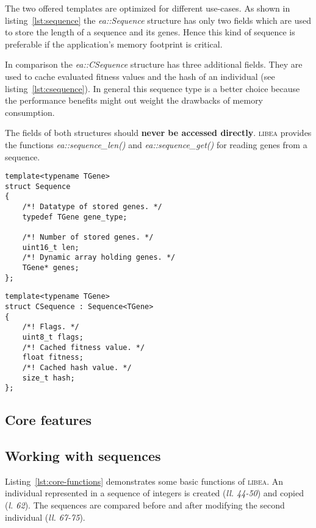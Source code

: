 \documentclass[a4paper]{article}
\begin{document}
The two offered templates are optimized for different use-cases. As shown in listing~\ref{lst:sequence} the \textit{ea::Sequence} structure has only two fields which are used to store the length of a sequence and its genes. Hence this kind of sequence is preferable if the application's memory footprint is critical.

In comparison the \textit{ea::CSequence} structure has three additional fields. They are used to cache evaluated fitness values and the hash of an individual (see listing~\ref{lst:csequence}). In general this sequence type is a better choice because the performance benefits might out weight the drawbacks of memory consumption.

The fields of both structures should \textbf{never be accessed directly}. \textsc{libea} provides the functions \textit{ea::sequence\_len()} and \textit{ea::sequence\_get()} for reading genes from a sequence.

\begin{lstlisting}[caption=Sequence template declaration, label=lst:sequence]
template<typename TGene>
struct Sequence
{
	/*! Datatype of stored genes. */
	typedef TGene gene_type;

	/*! Number of stored genes. */
	uint16_t len;
	/*! Dynamic array holding genes. */
	TGene* genes;
};
\end{lstlisting}

\begin{lstlisting}[caption=CSequence template declaration, label=lst:csequence]
template<typename TGene>
struct CSequence : Sequence<TGene>
{
	/*! Flags. */
	uint8_t flags;
	/*! Cached fitness value. */
	float fitness;
	/*! Cached hash value. */
	size_t hash;
};
\end{lstlisting}

\subsection{Core features}

\subsection{Working with sequences}

Listing~\ref{lst:core-functions} demonstrates some basic functions of \textsc{libea}. An individual represented in a sequence of integers is created (\textit{ll. 44-50}) and copied (\textit{l. 62}). The sequences are compared before and after modifying the second individual (\textit{ll. 67-75}).
\end{document}
